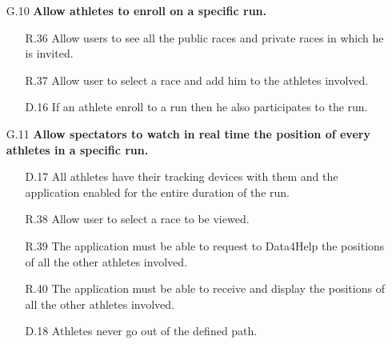 \begin{enumerate}
\begin{enumerate}
	\item [G.10] \textbf{Allow athletes to enroll on a specific run.}
		\begin{enumerate}
		\item [R.36] Allow users to see all the public races and private races in which he is invited.
		\item [R.37] Allow user to select a race and add him to the athletes involved.
		\item [D.16] If an athlete enroll to a run then he also participates to the run.
		\end{enumerate}
	
	\item [G.11] \textbf{Allow spectators to watch in real time the position of every athletes in a specific run.}
		\begin{enumerate}
		\item [D.17] All athletes have their tracking devices with them and the application enabled for the entire duration of the run.	
		\item [R.38] Allow user to select a race to be viewed.
		\item [R.39] The application must be able to request to Data4Help the positions of all the other athletes involved.
		\item [R.40] The application must be able to receive and display the positions of all the other athletes involved.
		\item [D.18] Athletes never go out of the defined path.
		\end{enumerate}
	\end{enumerate}

\end{enumerate}


